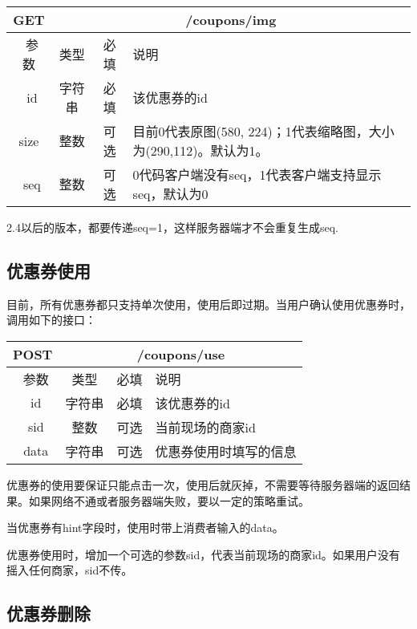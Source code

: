 \begin{table}[H]
   \begin{center}
\begin{tabular}{|c|c|c|p{12cm}|}
\hline
GET & \multicolumn{3}{|c|}{/coupons/img} \\
\hline\hline
 \  参数  & 类型 & 必填 &  说明  \\
\hline
 \  id  & 字符串 & 必填 &  该优惠券的id  \\
\hline
 size  & 整数 & 可选 &  目前0代表原图(580, 224)；1代表缩略图，大小为(290,112)。默认为1。\\ 
 \hline
 \  seq  & 整数 & 可选 &  0代码客户端没有seq，1代表客户端支持显示seq，默认为0 \\
\hline
\end{tabular}
   \end{center}
\end{table}
2.4以后的版本，都要传递seq=1，这样服务器端才不会重复生成seq.


\subsection{优惠券使用}
目前，所有优惠券都只支持单次使用，使用后即过期。当用户确认使用优惠券时，调用如下的接口：
\begin{table}[H]
   \begin{center}
\begin{tabular}{|c|c|c|p{12cm}|}
\hline
POST & \multicolumn{3}{|c|}{/coupons/use} \\
\hline\hline
 \  参数  & 类型 & 必填 &  说明  \\
\hline
 \  id  & 字符串 & 必填 &  该优惠券的id  \\
 \hline
 \ sid  &  整数 & 可选 & 当前现场的商家id\\  
 \hline
 \  data  & 字符串 & 可选 &  优惠券使用时填写的信息  \\
\hline
\end{tabular}
   \end{center}
\end{table}

优惠券的使用要保证只能点击一次，使用后就灰掉，不需要等待服务器端的返回结果。如果网络不通或者服务器端失败，要以一定的策略重试。

当优惠券有hint字段时，使用时带上消费者输入的data。

优惠券使用时，增加一个可选的参数sid，代表当前现场的商家id。如果用户没有摇入任何商家，sid不传。

\subsection{优惠券删除}


